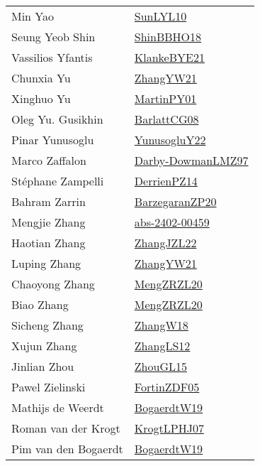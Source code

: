 {\begin{longtable}{p{4cm}p{20cm}}
Min Yao & \href{papers/SunLYL10.pdf}{SunLYL10}\cite{SunLYL10} \\
Seung Yeob Shin & \href{articles/ShinBBHO18.pdf}{ShinBBHO18}\cite{ShinBBHO18} \\
Vassilios Yfantis & \href{papers/KlankeBYE21.pdf}{KlankeBYE21}\cite{KlankeBYE21} \\
Chunxia Yu & \href{articles/ZhangYW21.pdf}{ZhangYW21}\cite{ZhangYW21} \\
Xinghuo Yu & \href{articles/MartinPY01.pdf}{MartinPY01}\cite{MartinPY01} \\
Oleg Yu. Gusikhin & \href{papers/BarlattCG08.pdf}{BarlattCG08}\cite{BarlattCG08} \\
Pinar Yunusoglu & \href{}{YunusogluY22}\cite{YunusogluY22} \\
Marco Zaffalon & \href{articles/Darby-DowmanLMZ97.pdf}{Darby-DowmanLMZ97}\cite{Darby-DowmanLMZ97} \\
St{\'{e}}phane Zampelli & \href{papers/DerrienPZ14.pdf}{DerrienPZ14}\cite{DerrienPZ14} \\
Bahram Zarrin & \href{papers/BarzegaranZP20.pdf}{BarzegaranZP20}\cite{BarzegaranZP20} \\
Mengjie Zhang & \href{articles/abs-2402-00459.pdf}{abs-2402-00459}\cite{abs-2402-00459} \\
Haotian Zhang & \href{papers/ZhangJZL22.pdf}{ZhangJZL22}\cite{ZhangJZL22} \\
Luping Zhang & \href{articles/ZhangYW21.pdf}{ZhangYW21}\cite{ZhangYW21} \\
Chaoyong Zhang & \href{articles/MengZRZL20.pdf}{MengZRZL20}\cite{MengZRZL20} \\
Biao Zhang & \href{articles/MengZRZL20.pdf}{MengZRZL20}\cite{MengZRZL20} \\
Sicheng Zhang & \href{articles/ZhangW18.pdf}{ZhangW18}\cite{ZhangW18} \\
Xujun Zhang & \href{papers/ZhangLS12.pdf}{ZhangLS12}\cite{ZhangLS12} \\
Jinlian Zhou & \href{papers/ZhouGL15.pdf}{ZhouGL15}\cite{ZhouGL15} \\
Pawel Zielinski & \href{papers/FortinZDF05.pdf}{FortinZDF05}\cite{FortinZDF05} \\
Mathijs de Weerdt & \href{papers/BogaerdtW19.pdf}{BogaerdtW19}\cite{BogaerdtW19} \\
Roman van der Krogt & \href{papers/KrogtLPHJ07.pdf}{KrogtLPHJ07}\cite{KrogtLPHJ07} \\
Pim van den Bogaerdt & \href{papers/BogaerdtW19.pdf}{BogaerdtW19}\cite{BogaerdtW19} \\

\end{longtable}}
